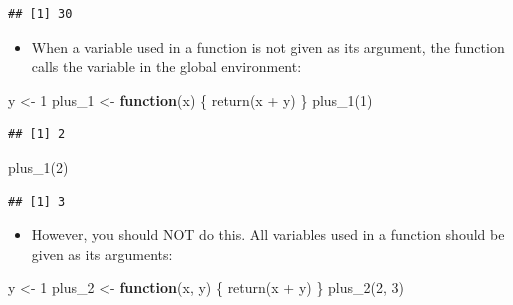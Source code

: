 \documentclass[
]{book}
\newenvironment{Shaded}{\begin{snugshade}}{\end{snugshade}}
\newcommand{\ControlFlowTok}[1]{\textcolor[rgb]{0.13,0.29,0.53}{\textbf{#1}}}
\newcommand{\DecValTok}[1]{\textcolor[rgb]{0.00,0.00,0.81}{#1}}
\newcommand{\FunctionTok}[1]{\textcolor[rgb]{0.00,0.00,0.00}{#1}}
\newcommand{\NormalTok}[1]{#1}
\newcommand{\OtherTok}[1]{\textcolor[rgb]{0.56,0.35,0.01}{#1}}
\newcommand{\SpecialCharTok}[1]{\textcolor[rgb]{0.00,0.00,0.00}{#1}}
\providecommand{\tightlist}{%
  \setlength{\itemsep}{0pt}\setlength{\parskip}{0pt}}
\begin{document}
\begin{verbatim}
## [1] 30
\end{verbatim}

\begin{itemize}
\tightlist
\item
  When a variable used in a function is not given as its argument, the function calls the variable in the global environment:
\end{itemize}

\begin{Shaded}
\begin{Highlighting}[]
\NormalTok{y }\OtherTok{\textless{}{-}} \DecValTok{1}
\NormalTok{plus\_1 }\OtherTok{\textless{}{-}} \ControlFlowTok{function}\NormalTok{(x) \{}
  \FunctionTok{return}\NormalTok{(x }\SpecialCharTok{+}\NormalTok{ y)}
\NormalTok{\}}
\FunctionTok{plus\_1}\NormalTok{(}\DecValTok{1}\NormalTok{)}
\end{Highlighting}
\end{Shaded}

\begin{verbatim}
## [1] 2
\end{verbatim}

\begin{Shaded}
\begin{Highlighting}[]
\FunctionTok{plus\_1}\NormalTok{(}\DecValTok{2}\NormalTok{)}
\end{Highlighting}
\end{Shaded}

\begin{verbatim}
## [1] 3
\end{verbatim}

\begin{itemize}
\tightlist
\item
  However, you should NOT do this. All variables used in a function should be given as its arguments:
\end{itemize}

\begin{Shaded}
\begin{Highlighting}[]
\NormalTok{y }\OtherTok{\textless{}{-}} \DecValTok{1}
\NormalTok{plus\_2 }\OtherTok{\textless{}{-}} \ControlFlowTok{function}\NormalTok{(x, y) \{}
  \FunctionTok{return}\NormalTok{(x }\SpecialCharTok{+}\NormalTok{ y)}
\NormalTok{\}}
\FunctionTok{plus\_2}\NormalTok{(}\DecValTok{2}\NormalTok{, }\DecValTok{3}\NormalTok{)}
\end{Highlighting}
\end{Shaded}
\end{document}
